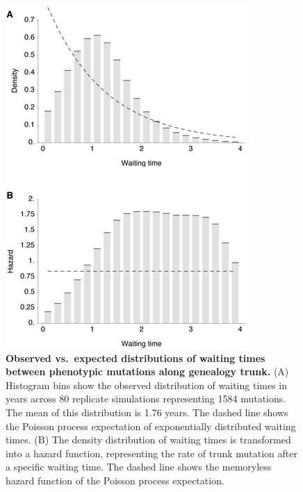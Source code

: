 \documentclass[11pt,oneside,letterpaper]{article}
\begin{document}
\vspace*{\fill}
\begin{figure}[H]
	\centering
	\includegraphics{figures/waittimes}
	\caption{\textbf{Observed vs.\ expected distributions of waiting times between phenotypic mutations along genealogy trunk.} (A) Histogram bins show the observed distribution of waiting times in years across 80 replicate simulations representing 1584 mutations.  The mean of this distribution is 1.76 years.  The dashed line shows the Poisson process expectation of exponentially distributed waiting times.  (B) The density distribution of waiting times is transformed into a hazard function, representing the rate of trunk mutation after a specific waiting time.  The dashed line shows the memoryless hazard function of the Poisson process expectation.}
	\label{waittimes}
\end{figure}
\vspace*{\fill}

\pagebreak
\end{document}
